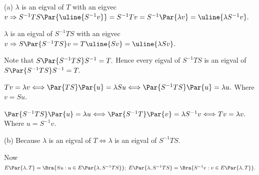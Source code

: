 \par\quad
(a) $\lambda$ is an eigval of $T$ with an eigvec $v\Rightarrow S^{-1}TS\Par{\uline{S^{-1}v}}=S^{-1}Tv=S^{-1}\Par{\lambda v}=\uline{\lambda S^{-1}v}.$\par\vspace{2pt}\quad\Ha
$\lambda$ is an eigval of $S^{-1}TS$ with an eigvec $v\Rightarrow S\Par{S^{-1}TS}v=T\uline{Sv}=\uline{\lambda Sv}.$\vspace{2pt}\par\quad\Ha
\Or Note that $S\Par{S^{-1}TS}S^{-1}=T.$ Hence every eigval of $S^{-1}TS$ is an eigval of $S\Par{S^{-1}TS}S^{-1}=T.$\vspace{5pt}\par\quad\Ha
\Or $Tv=\lambda v\Longleftrightarrow\Par{TS}\Par{u}=\lambda Su\Longleftrightarrow\Par{S^{-1}TS}\Par{u}=\lambda u.$ Where $v=Su.$\vspace{2pt}\par\quad\Ha
\Blind{\Or}$\Par{S^{-1}TS}\Par{u}=\lambda u\Longleftrightarrow\Par{S^{-1}T}\Par{v}=\lambda S^{-1}v\Longleftrightarrow Tv=\lambda v.$ Where $u=S^{-1}v.$\vspace{4pt}\par\quad
(b) Because $\lambda$ is an eigval of $T\Longleftrightarrow \lambda$ is an eigval of $S^{-1}TS.$\par\quad\Hb
{} Now $E\Par{\lambda,T}=\Bra{Su:u\in E\Par{\lambda,S^{-1}TS}};\;E\Par{\lambda,S^{-1}TS}=\Bra{S^{-1}v:v\in E\Par{\lambda,T}}.$\PfEnd
\SepLine

